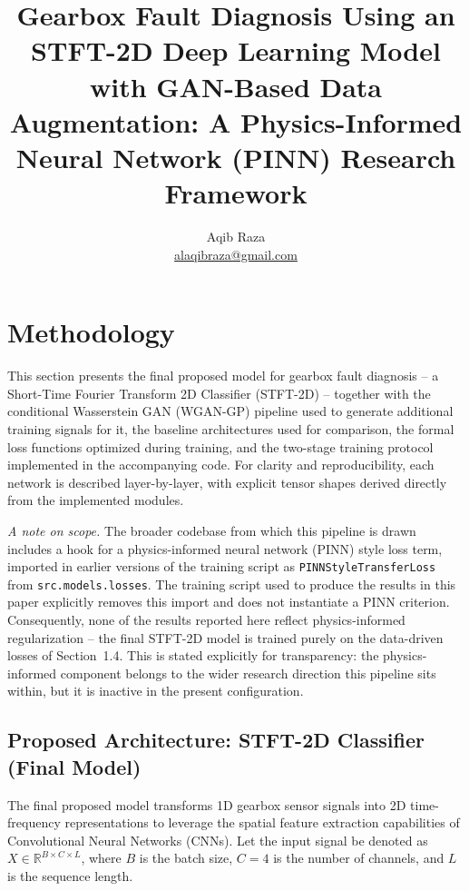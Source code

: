 \documentclass[12pt]{article}
\title{Gearbox Fault Diagnosis Using an STFT-2D Deep Learning Model with GAN-Based Data Augmentation: A Physics-Informed Neural Network (PINN) Research Framework}
\author{Aqib Raza \\ \href{mailto:alaqibraza@gmail.com}{alaqibraza@gmail.com}}
\date{}
\begin{document}
\maketitle

\section{Methodology}
This section presents the final proposed model for gearbox fault diagnosis -- a Short-Time Fourier Transform 2D Classifier (STFT-2D) -- together with the conditional Wasserstein GAN (WGAN-GP) pipeline used to generate additional training signals for it, the baseline architectures used for comparison, the formal loss functions optimized during training, and the two-stage training protocol implemented in the accompanying code. For clarity and reproducibility, each network is described layer-by-layer, with explicit tensor shapes derived directly from the implemented modules.

\emph{A note on scope.} The broader codebase from which this pipeline is drawn includes a hook for a physics-informed neural network (PINN) style loss term, imported in earlier versions of the training script as \texttt{PINNStyleTransferLoss} from \texttt{src.models.losses}. The training script used to produce the results in this paper explicitly removes this import and does not instantiate a PINN criterion. Consequently, none of the results reported here reflect physics-informed regularization -- the final STFT-2D model is trained purely on the data-driven losses of Section~1.4. This is stated explicitly for transparency: the physics-informed component belongs to the wider research direction this pipeline sits within, but it is inactive in the present configuration.

\subsection{Proposed Architecture: STFT-2D Classifier (Final Model)}
The final proposed model transforms 1D gearbox sensor signals into 2D time-frequency representations to leverage the spatial feature extraction capabilities of Convolutional Neural Networks (CNNs). Let the input signal be denoted as $X \in \mathbb{R}^{B \times C \times L}$, where $B$ is the batch size, $C=4$ is the number of channels, and $L$ is the sequence length.
\end{document}
